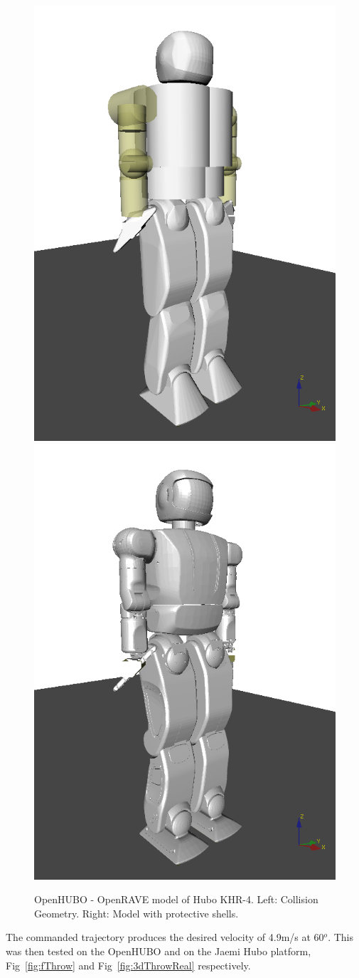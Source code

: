 \begin{figure}[h]
  \centering
\includegraphics[width=0.5\columnwidth]{./pix/hCol.png}\includegraphics[width=0.5\columnwidth]{./pix/hBody.png}
  \caption{OpenHUBO - OpenRAVE model of Hubo KHR-4.  Left: Collision Geometry.  Right: Model with protective shells\cite{dlofaro-srm}.  }
  \label{fig:vHubo}
\end{figure}

The commanded trajectory produces the desired velocity of 4.9m/s at 60$^o$.  This was then tested on the OpenHUBO and on the Jaemi Hubo platform, Fig~\ref{fig:fThrow} and Fig~\ref{fig:3dThrowReal} respectively.




